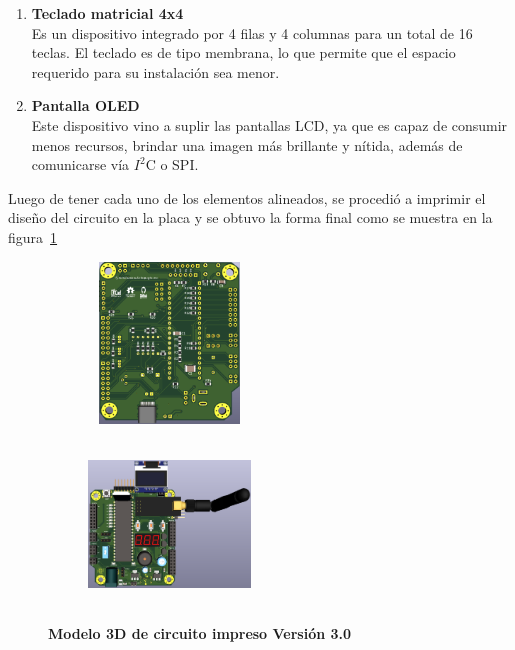 \documentclass[times, 10pt,twocolumn]{article}
\begin{document}
\begin{enumerate}[label=\emph{\Alph*.}]
  \item \textbf{Teclado matricial 4x4}\\ Es un dispositivo integrado por 4 filas y 4 columnas para un total de 16 teclas. El teclado es de tipo membrana, lo que permite que el espacio requerido para su instalación sea menor.
  \item \textbf{Pantalla OLED}\\ Este dispositivo vino a suplir las pantallas LCD, ya
que es capaz de consumir menos recursos, brindar una imagen más brillante y nítida, además de comunicarse vía $I^{2}$C o SPI.
\end{enumerate}


Luego de tener cada uno de los elementos alineados, se procedió a imprimir el diseño del circuito en la placa y se obtuvo la forma final como se muestra en la figura~\ref{fig:11}

\begin{figure}[H]
  \begin{subfigure}[b]{0.4\columnwidth}
    \includegraphics[width=4.3cm, height=4.3cm]{Img/tercera_version_pcb_b.png}
  \end{subfigure}
    \hspace{0.7cm}
  \begin{subfigure}[b]{0.4\columnwidth}
     \includegraphics[width=4.3cm, height=4.3cm]{Img/tercera_version_3d.png}
  \end{subfigure}
   \caption{\centering \textbf{Modelo 3D de circuito impreso Versión 3.0}} 
   \label{fig:11}
 \end{figure}
\end{document}
